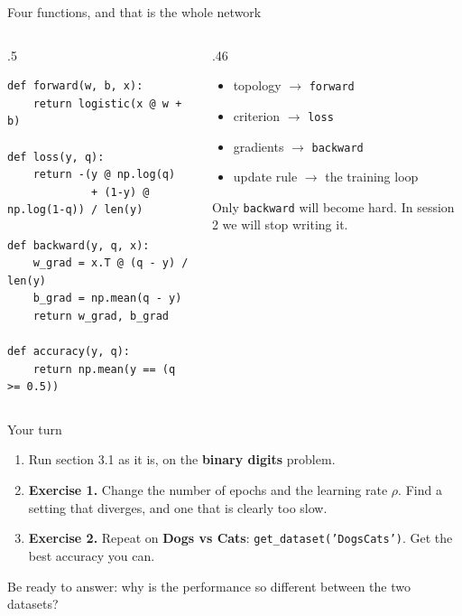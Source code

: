 \documentclass[aspectratio=169,10pt]{beamer}
\begin{document}
\begin{frame}[fragile]{Four functions, and that is the whole network}
\begin{columns}[T]
\begin{column}{.5\textwidth}
\begin{lstlisting}
def forward(w, b, x):
    return logistic(x @ w + b)

def loss(y, q):
    return -(y @ np.log(q)
             + (1-y) @ np.log(1-q)) / len(y)

def backward(y, q, x):
    w_grad = x.T @ (q - y) / len(y)
    b_grad = np.mean(q - y)
    return w_grad, b_grad

def accuracy(y, q):
    return np.mean(y == (q >= 0.5))
\end{lstlisting}
\end{column}
\begin{column}{.46\textwidth}
\begin{keybox}
\small
\begin{itemize}
  \item topology \;$\rightarrow$\; \texttt{forward}
  \item criterion \;$\rightarrow$\; \texttt{loss}
  \item gradients \;$\rightarrow$\; \texttt{backward}
  \item update rule \;$\rightarrow$\; the training loop
\end{itemize}
Only \texttt{backward} will become hard. In session 2 we will stop writing it.
\end{keybox}
\end{column}
\end{columns}
\end{frame}

\begin{frame}[fragile]{Your turn}
\begin{practice}
\begin{enumerate}
  \item Run section 3.1 as it is, on the \textbf{binary digits} problem.
  \item \textbf{Exercise 1.} Change the number of epochs and the learning rate $\rho$.
        Find a setting that diverges, and one that is clearly too slow.
  \item \textbf{Exercise 2.} Repeat on \textbf{Dogs vs Cats}:
        \texttt{get\_dataset('DogsCats')}. Get the best accuracy you can.
\end{enumerate}
\vspace{.3em}
Be ready to answer: \alert{why is the performance so different between the two datasets?}
\end{practice}
\end{frame}
\end{document}
